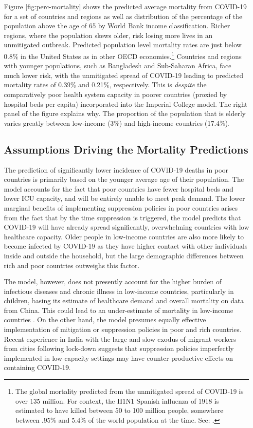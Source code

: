 \documentclass[11pt]{article}
\begin{document}
Figure \ref{fig:perc-mortality} shows the predicted average mortality from COVID-19 for a set of countries and regions as well as distribution of the percentage of the population above the age of 65 by World Bank income classification. Richer regions, where the population skews older, risk losing more lives in an unmitigated outbreak. Predicted population level mortality rates are just below 0.8\% in the United States as in other OECD economies.\footnote{
    The global mortality predicted from the unmitigated spread of COVID-19 is over 135 million. For context, the H1N1 Spanish influenza of 1918 is estimated to have killed between 50 to 100 million people, somewhere between .95\% and 5.4\% of the world population at the time. See: \textcite{taubenberger2006,johnson2002}.}
Countries and regions with younger populations, such as Bangladesh and Sub-Saharan Africa, face much lower risk, with the unmitigated spread of COVID-19 leading to predicted mortality rates of 0.39\% and 0.21\%, respectively. This is \emph{despite} the comparatively poor health system capacity in poorer countries (proxied by hospital beds per capita) incorporated into the Imperial College model. The right panel of the figure explains why. The proportion of the population that is elderly varies greatly between low-income (3\%) and high-income countries (17.4\%).

\subsection{Assumptions Driving the Mortality Predictions}

The prediction of significantly lower incidence of COVID-19 deaths in poor countries is primarily based on the younger average age of their population. The model accounts for the fact that poor countries have fewer hospital beds and lower ICU capacity, and will be entirely unable to meet peak demand. The lower marginal benefits of implementing suppression policies in poor countries arises from the fact that by the time suppression is triggered, the model predicts that COVID-19 will have already spread significantly, overwhelming countries with low healthcare capacity. Older people in low-income countries are also more likely to become infected by COVID-19 as they have higher contact with other individuals inside and outside the household, but the large demographic differences between rich and poor countries outweighs this factor.

The model, however, does not presently account for the higher burden of infectious diseases and chronic illness in low-income countries, particularly in children, basing its estimate of healthcare demand and overall mortality on data from China. This could lead to an under-estimate of mortality in low-income countries \parencite{walker2020}. On the other hand, the model presumes equally effective implementation of mitigation or suppression policies in poor and rich countries. Recent experience in India with the large and slow exodus of migrant workers from cities following lock-down suggests that suppression policies imperfectly implemented in low-capacity settings may have counter-productive effects on containing COVID-19.
\end{document}
